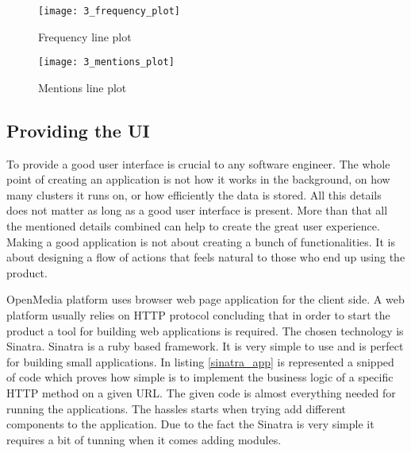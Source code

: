 \begin{figure}[!ht]
\centering
\texttt{[image: 3\_frequency\_plot]}
\caption{Frequency line plot}\label{frequency_plot}
\end{figure}

\begin{figure}[!ht]
\centering
\texttt{[image: 3\_mentions\_plot]}
\caption{Mentions line plot}\label{mentions_plot}
\end{figure}

\subsection{Providing the UI}
To provide a good user interface is crucial to any software engineer. The whole point of creating an application is not how it works in the background, on how many clusters it runs on, or how efficiently the data is stored. All this details does not matter as long as a good user interface is present. More than that all the mentioned details combined can help to create the great user experience. Making a good application is not about creating a bunch of functionalities. It is about designing a flow of actions that feels natural to those who end up using the product.

OpenMedia platform uses browser web page application for the client side. A web platform usually relies on HTTP protocol concluding that in order to start the product a tool for building web applications is required. The chosen technology is Sinatra\cite{sinatra}. Sinatra is a ruby based framework. It is very simple to use and is perfect for building small applications. In listing \ref{sinatra_app} is represented a snipped of code which proves how simple is to implement the business logic of a specific HTTP method on a given URL. The given code is almost everything needed for running the applications. The hassles starts when trying add different components to the application. Due to the fact the Sinatra is very simple it requires a bit of tunning when it comes adding modules.



